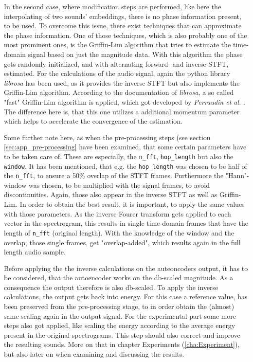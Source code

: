 In the second case, where modification steps are performed, like here the interpolating of two sounds' embeddings, there is no phase information present, to be used. To overcome this issue, there exist techniques that can approximate the phase information. One of those techniques, which is also probably one of the most prominent ones, is the Griffin-Lim \cite{Griffin1984} algorithm that tries to estimate the time-domain signal based on just the magnitude data. With this algorithm the phase gets randomly initialized, and with alternating forward- and inverse STFT, estimated. For the calculations of the audio signal, again the python library \textit{librosa} \cite{brian_mcfee_2022_6097378} has been used, as it provides the inverse STFT but also implements the Griffin-Lim algorithm. According to the documentation of \textit{librosa}, a so called "fast" Griffin-Lim algorithm is applied, which got developed by \textit{Perraudin et al.} \cite{Perraudin2013}. The difference here is, that this one utilizes a additional momentum parameter which helps to accelerate the convergence of the estimation. 

Some further note here, as when the pre-processing steps (see section \ref{sec:app_pre-processing} have been examined, that some certain parameters have to be taken care of. These are especially, the \texttt{n\_fft}, \texttt{hop\_length} but also the \texttt{window}. It has been mentioned, that e.g. the \texttt{hop\_length} was chosen to be half of the \texttt{n\_fft}, to ensure a 50\% overlap of the STFT frames. Furthermore the "Hann"-window was chosen, to be multiplied with the signal frames, to avoid discontinuities. Again, those also appear in the inverse STFT as well as Griffin-Lim. In order to obtain the best result, it is important, to apply the same values with those parameters. As the inverse Fourer transform gets applied to each vector in the spectrogram, this results in single time-domain frames that have the length of \texttt{n\_fft} (original length). With the knowledge of the window and the overlap, those single frames, get "overlap-added", which results again in the full length audio sample. 

Before applying the the inverse calculations on the auteoncoders output, it has to be considered, that the autoencoder works on the db-scaled magnitude. As a consequence the output therefore is also db-scaled. To apply the inverse calculations, the output gets back into energy. For this case a reference value, has been preserved from the pre-processing stage, to in order obtain the (almost) same scaling again in the output signal. For the experimental part some more steps also got applied, like scaling the energy according to the average energy present in the original spectrograms. This step should also correct and improve the resulting sounds. More on that in chapter Experiments (\ref{cha:Experiment}), but also later on when examining and discussing the results.\\


